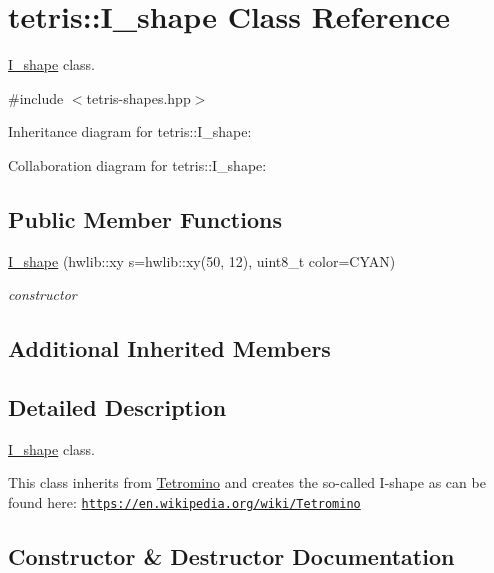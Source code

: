 \hypertarget{classtetris_1_1I__shape}{}\section{tetris\+:\+:I\+\_\+shape Class Reference}
\label{classtetris_1_1I__shape}


\hyperlink{classtetris_1_1I__shape}{I\+\_\+shape} class.  




{\ttfamily \#include $<$tetris-\/shapes.\+hpp$>$}



Inheritance diagram for tetris\+:\+:I\+\_\+shape\+:


Collaboration diagram for tetris\+:\+:I\+\_\+shape\+:
\subsection*{Public Member Functions}
\begin{DoxyCompactItemize}
\item 
\hyperlink{classtetris_1_1I__shape_a9a67514fc57ef9508ecc909430016236}{I\+\_\+shape} (hwlib\+::xy s=hwlib\+::xy(50, 12), uint8\+\_\+t color=C\+Y\+AN)
\begin{DoxyCompactList}\small\item\em constructor \end{DoxyCompactList}\end{DoxyCompactItemize}
\subsection*{Additional Inherited Members}


\subsection{Detailed Description}
\hyperlink{classtetris_1_1I__shape}{I\+\_\+shape} class. 

This class inherits from \hyperlink{classtetris_1_1Tetromino}{Tetromino} and creates the so-\/called I-\/shape as can be found here\+: \href{https://en.wikipedia.org/wiki/Tetromino}{\tt https\+://en.\+wikipedia.\+org/wiki/\+Tetromino} 

\subsection{Constructor \& Destructor Documentation}
\mbox{\label{classtetris_1_1I__shape_a9a67514fc57ef9508ecc909430016236}} 
